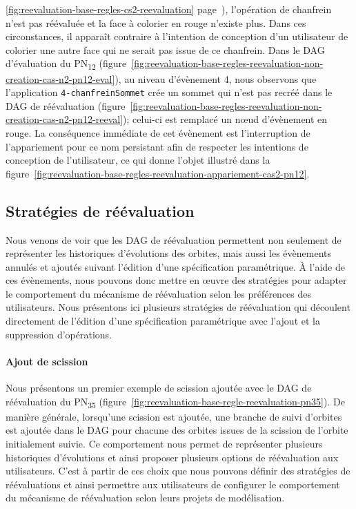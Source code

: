 \ref{fig:reevaluation-base-regles-cs2-reevaluation}
page~\pageref{fig:reevaluation-base-regles-cs2-reevaluation}), l'opération de
chanfrein n'est pas réévaluée et la face à colorier en rouge n'existe plus. %
Dans ces circonstances, il apparaît contraire à l'intention de conception d'un
utilisateur de colorier une autre face qui ne serait pas issue de ce
chanfrein. %
Dans le DAG d'évaluation du PN\textsubscript{12}
(figure~\ref{fig:reevaluation-base-regles-reevaluation-non-creation-cas-n2-pn12-eval}),
au niveau d'évènement 4, nous observons que l'application
\texttt{4-\allowbreak{}chanfrein\-Sommet} crée un sommet qui n'est pas recréé dans le DAG de
réévaluation
(figure~\ref{fig:reevaluation-base-regles-reevaluation-non-creation-cas-n2-pn12-reeval});
celui-ci est remplacé un n\oe ud d'évènement \nocreationnodeevent[red]{} en
	{\color{red}rouge}. %
La conséquence immédiate de cet évènement est l'interruption de l'appariement
pour ce nom persistant afin de respecter les intentions de conception de
l'utilisateur, ce qui donne l'objet illustré dans la
figure~\ref{fig:reevaluation-base-regles-reevaluation-appariement-cas2-pn12}. %



\subsection{Stratégies de réévaluation}
\label{sec:reevaluation-base-regles-reevaluation-strategies}



Nous venons de voir que les DAG de réévaluation permettent non seulement de représenter les historiques
d'évolutions des orbites, mais aussi les évènements
annulés et ajoutés suivant l'édition d'une spécification paramétrique. %
À l'aide de ces évènements, nous pouvons donc mettre en \oe uvre des stratégies pour
adapter le comportement du mécanisme de réévaluation selon les préférences des
utilisateurs. %
Nous présentons ici plusieurs stratégies de réévaluation qui découlent
directement de l'édition d'une spécification paramétrique avec l'ajout et la
suppression d'opérations. %

\paragraph*{Ajout de scission}

Nous présentons un premier exemple de scission ajoutée avec le DAG de
réévaluation du PN\textsubscript{35}
(figure~\ref{fig:reevaluation-base-regle-reevaluation-pn35}). %
De manière générale, lorsqu'une scission est ajoutée, une branche de suivi
d'orbites est ajoutée dans le DAG pour chacune des orbites issues de la scission
de l'orbite initialement suivie. %
Ce comportement nous permet de représenter plusieurs historiques d'évolutions et
ainsi proposer plusieurs options de réévaluation aux utilisateurs. %
C'est à partir de ces choix que nous pouvons définir des stratégies de
réévaluations et ainsi permettre aux utilisateurs de configurer le comportement
du mécanisme de réévaluation selon leurs projets de modélisation. %

